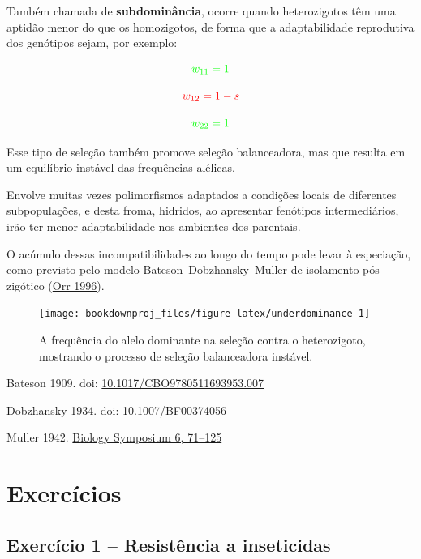 \documentclass[
]{book}
\begin{document}
Também chamada de \textbf{subdominância}, ocorre quando heterozigotos têm uma aptidão menor do que os
homozigotos, de forma que a adaptabilidade reprodutiva dos genótipos sejam, por exemplo:

\[ \color{green}{w_{11} = 1}\]

\[ \color{red}{w_{12} = 1-s}\]

\[ \color{green}{w_{22} = 1}\]

Esse tipo de seleção também promove seleção balanceadora, mas que resulta em um equilíbrio instável das frequências alélicas.

Envolve muitas vezes polimorfismos adaptados a condições locais de diferentes subpopulações, e desta froma, hidridos, ao apresentar fenótipos intermediários, irão ter menor adaptabilidade nos ambientes dos parentais.

O acúmulo dessas incompatibilidades ao longo do tempo pode levar à especiação, como previsto pelo modelo Bateson--Dobzhansky--Muller de isolamento pós-zigótico (\href{https://doi.org/10.1093/genetics/144.4.1331}{Orr 1996}).

\begin{figure}

{\centering \texttt{[image: bookdownproj\_files/figure-latex/underdominance-1]} 

}

\caption{A frequência  do alelo dominante na seleção contra o heterozigoto, mostrando o processo de seleção balanceadora instável.}\label{fig:underdominance}
\end{figure}

Bateson 1909. doi: \href{https://doi.org/10.1017/CBO9780511693953.007}{10.1017/CBO9780511693953.007}

Dobzhansky 1934. doi: \href{https://doi.org/10.1007/BF00374056}{10.1007/BF00374056}

Muller 1942. \href{https://www.ucl.ac.uk/taxome/lit/muller\%201942\%20new\%20enh.pdf}{Biology Symposium 6, 71--125}

\hypertarget{exercuxedcios-7}{%
\section{Exercícios}\label{exercuxedcios-7}}

\hypertarget{exercuxedcio-1-resistuxeancia-a-inseticidas}{%
\subsection{Exercício 1 -- Resistência a inseticidas}\label{exercuxedcio-1-resistuxeancia-a-inseticidas}}
\end{document}
